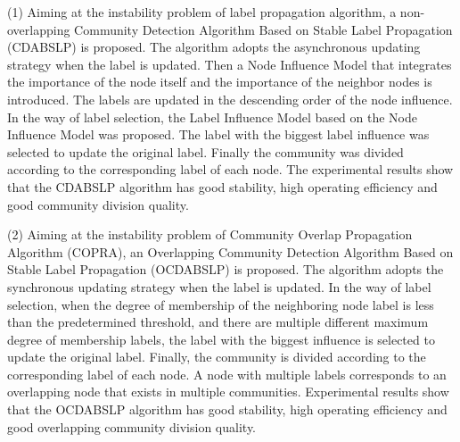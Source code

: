 \begin{englishabstract}
(1) Aiming at the instability problem of label propagation algorithm, a non-overlapping Community Detection Algorithm Based on Stable Label Propagation (CDABSLP) is proposed. The algorithm adopts the asynchronous updating strategy when the label is updated. Then a Node Influence Model that integrates the importance of the node itself and the importance of the neighbor nodes is introduced. The labels are updated in the descending order of the node influence. In the way of label selection, the Label Influence Model based on the Node Influence Model was proposed. The label with the biggest label influence was selected to update the original label. Finally the community was divided according to the corresponding label of each node. The experimental results show that the CDABSLP algorithm has good stability, high operating efficiency and good community division quality.
   
(2) Aiming at the instability problem of Community Overlap Propagation Algorithm (COPRA), an Overlapping Community Detection Algorithm Based on Stable Label Propagation (OCDABSLP) is proposed. The algorithm adopts the synchronous updating strategy when the label is updated. In the way of label selection, when the degree of membership of the neighboring node label is less than the predetermined threshold, and there are multiple different maximum degree of membership labels, the label with the biggest influence is selected to update the original label.  Finally, the community is divided according to the corresponding label of each node. A node with multiple labels corresponds to an overlapping node that exists in multiple communities. Experimental results show that the OCDABSLP algorithm has good stability, high operating efficiency and good overlapping community division quality.


\end{englishabstract}
